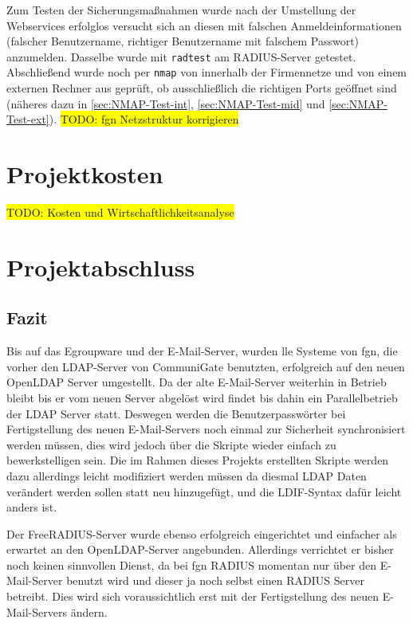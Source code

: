 \documentclass[11pt,a4paper,titlepage=firstiscover,headsepline,bibtotoc]{scrartcl} %
\newcommand{\hilight}[1]{\colorbox{yellow}{#1}} %
\begin{document}
\medskip \noindent
Zum Testen der Sicherungsmaßnahmen wurde nach der Umstellung der Webservices erfolglos versucht sich an diesen mit falschen Anmeldeinformationen (falscher Benutzername, richtiger Benutzername mit falschem Passwort) anzumelden. Dasselbe wurde mit \texttt{radtest} am RADIUS-Server getestet.
Abschließend wurde noch per \texttt{nmap} von innerhalb der Firmennetze und von einem externen Rechner aus geprüft, ob ausschließlich die richtigen Ports geöffnet sind (näheres dazu in \autoref{sec:NMAP-Test-int}, \autoref{sec:NMAP-Test-mid} und \autoref{sec:NMAP-Test-ext}).
\hilight{TODO: fgn Netzstruktur korrigieren}


\section{Projektkosten}\label{sec:Kosten}
\hilight{TODO: Kosten und Wirtschaftlichkeitsanalyse}

\section{Projektabschluss}
\subsection{Fazit}
Bis auf das Egroupware und der E-Mail-Server, wurden lle Systeme von fgn, die vorher den LDAP-Server von CommuniGate benutzten, erfolgreich auf den neuen OpenLDAP Server umgestellt. Da der alte E-Mail-Server weiterhin in Betrieb bleibt bis er vom neuen Server abgelöst wird findet bis dahin ein Parallelbetrieb der LDAP Server statt. Deswegen werden die Benutzerpasswörter bei Fertigstellung des neuen E-Mail-Servers noch einmal zur Sicherheit synchronisiert werden müssen, dies wird jedoch über die Skripte wieder einfach zu bewerkstelligen sein. Die im Rahmen dieses Projekts erstellten Skripte werden dazu allerdings leicht modifiziert werden müssen da diesmal LDAP Daten verändert werden sollen statt neu hinzugefügt, und die LDIF-Syntax dafür leicht anders ist.

Der FreeRADIUS-Server wurde ebenso erfolgreich eingerichtet und einfacher als erwartet an den OpenLDAP-Server angebunden. Allerdings verrichtet er bisher noch keinen sinnvollen Dienst, da bei fgn RADIUS momentan nur über den E-Mail-Server benutzt wird und dieser ja noch selbst einen RADIUS Server betreibt. Dies wird sich voraussichtlich erst mit der Fertigstellung des neuen E-Mail-Servers ändern.
\end{document}
